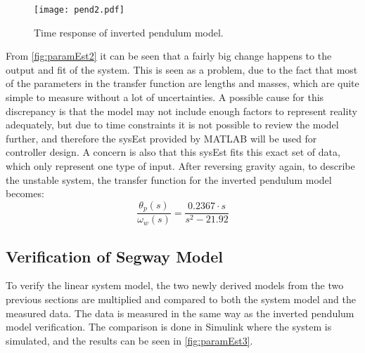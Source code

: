 

\begin{figure}[H]
    \centering
    \texttt{[image: pend2.pdf]}
\vspace{-0.3 cm}    
    \caption{Time response of inverted pendulum model.}
    \label{fig:paramEst2}
\end{figure} 
\vspace{-1 cm}
From \autoref{fig:paramEst2} it can be seen that a fairly big change happens to the output and fit of the system. This is seen as a problem, due to the fact that most of the parameters in the transfer function are lengths and masses, which are quite simple to measure without a lot of uncertainties. A possible cause for this discrepancy is that the model may not include enough factors to represent reality adequately, but due to time constraints it is not possible to review the model further, and therefore the sysEst provided by MATLAB will be used for controller design. A concern is also that this sysEst fits this exact set of data, which only represent one type of input. After reversing gravity again, to describe the unstable system, the transfer function for the inverted pendulum model becomes:
\begin{equation}
	\frac{\theta_p(s)}{\omega_w(s)}=\frac{0.2367\cdot s}{s^2 - 21.92}
\end{equation}
\subsection{Verification of Segway Model}
To verify the linear system model, the two newly derived models from the two previous sections are multiplied and compared to both the system model and the measured data. The data is measured in the same way as the inverted pendulum model verification. The comparison is done in Simulink where the system is simulated, and the results can be seen in \autoref{fig:paramEst3}.

